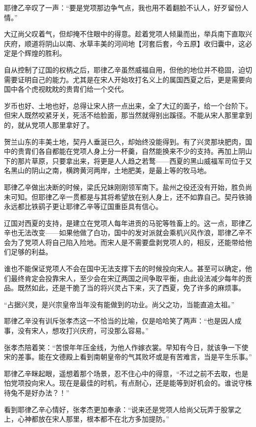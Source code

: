耶律乙辛叹了一声：“要是党项那边争气点，我也用不着翻脸不认人，好歹留份人情。”

大辽尚父叹着气，但却掩不住眼中的得意。趁着党项人倾巢而出，举兵南下直取兴庆府，顺道将阴山以南、水草丰美的河间地【河套后套，今五原】收归囊中，这必定是个辉煌的胜利。

自从控制了辽国的权柄之后，耶律乙辛虽然威福自用，但他的地位并不稳固，迫切需要证明自己的能力。尤其是在宋人开始攻打名义上的属国西夏之后，更是需要向国中各个虎视眈眈的贵胄们给一个交代。

岁币也好、土地也好，总得让宋人挤一点出来，全了大辽的面子，给一个台阶下。但宋人既然咬紧牙关，死活不给脸面，那当然就得别出蹊径。不能从宋人那里拿到的，就从党项人那里拿好了。

贺兰山东的丰美土地，契丹人垂涎已久，却始终没能得到。有了兴灵那块肥肉，国中的贵胄们各自都能在党项人身上分一杯羹，自然能换来不少的支持。再加上阴山下的那片草原，只要拿出来，将更是人人趋之若鹜——西夏的黑山威福军司位于又名黑山的阴山之南，横跨黄河两岸，土地肥美，是最上等的牧马地。

耶律乙辛做出决断的时候，梁氏兄妹刚刚领军南下。盐州之役还没有开始，胜负尚未可知。但耶律乙辛一贯都是与其将希望放在别人身上，还不如靠自己。契丹铁骑永远都比铁鹞子更让耶律乙辛等辽国重臣具有信心。

辽国对西夏的支持，是建立在党项人每年进贡的马驼等牲畜上的。这一点，耶律乙辛也无法改变——如果他做了白功，国中的发对派就会乘机兴风作浪，耶律乙辛不会为了党项人将自己陷入险地。而宋人是不需要盘剥党项人的，相反，还能带给他们足够的利益。

谁也不能保证党项人不会在国中无法支撑下去的时候投向宋人。甚至可以确定，他们最终肯定会投靠宋人，至少会在宋辽两国之间争取平衡，由此设法减少每年的贡品。既然如此，还是干脆了当的将兴灵占下来，灭了西夏，免了许多的麻烦事。

“占据兴灵，是兴宗皇帝当年没有能做到的功业。尚父之功，当能直追太祖。”

耶律乙辛没有训斥张孝杰这一不恰当的比喻，仅是哈哈笑了两声：“也是因人成事，没有宋人，想攻打兴庆府，可没那么容易。”

张孝杰陪着笑：“苦恨年年压金线，为他人作嫁衣裳。早知有今日，就该争一下使宋的差事。能在文德殿上看到南朝皇帝的气其败坏或是有苦难言，当是平生乐事。”

耶律乙辛眯起眼，遥想着那个场景，忍不住心中的得意，“不过之前不去取，也是怕党项投向宋人。现在是最佳的时机，有点耐心，还是能等到好机会的。谁说守株待兔不是好办法？！”

看到耶律乙辛心情好，张孝杰更加奉承：“说来还是党项人给尚父玩弄于股掌之上，心神都放在宋人那里，根本都不在北方多加提防。”

